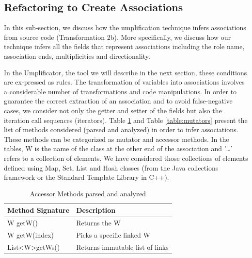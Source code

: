 \subsection{Refactoring to Create Associations}
In this sub-section, we discuss how the umplification technique infers associations from source code (Transformation 2b). More specifically, we discuss how our technique infers all the fields that represent associations including the role name, association ends, multiplicities and directionality.


In the Umplificator, the tool we will describe in the next section, these conditions are ex-pressed as rules. The transformation of variables into associations involves a considerable number of transformations and code manipulations. In order to guarantee the correct extraction of an association and to avoid false-negative cases, we consider not only the getter and setter of the fields but also the iteration call sequences (iterators). Table \ref{table:accessors} and Table \ref{table:mutators} present the list of methods considered (parsed and analyzed) in order to infer associations. These methods can be categorized as mutator and accessor methods. In the tables, W is the name of the class at the other end of the association and '…' refers to a collection of elements. We have considered those collections of elements defined using Map, Set, List and Hash classes (from the Java collections framework or the Standard Template Library in C++).

\begin{table}
\caption{Accessor Methods parsed and analyzed}
\label{table:accessors}
\centering
\begin{tabular}{ll}
\toprule
\rowcolor[HTML]{BBDAFF}
\textbf{Method Signature}   & \textbf{Description}                               \\ 
\hline
W getW()  		& Returns the W    \\ 
W getW(index)   & Picks a specific linked W   \\ 
List\textless W\textgreater getWs()   & Returns immutable list of links  \\ 
\hline
    \end{tabular}
\end{table}


